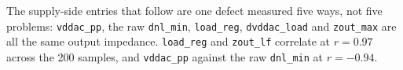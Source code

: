 The supply-side entries that follow are one defect measured five ways, not five problems:
\texttt{vddac\_pp}, the raw \texttt{dnl\_min}, \texttt{load\_reg}, \texttt{dvddac\_load}
and \texttt{zout\_max} are all the same output impedance. \texttt{load\_reg} and
\texttt{zout\_lf} correlate at \(r = \num{0.97}\) across the 200 samples, and
\texttt{vddac\_pp} against the raw \texttt{dnl\_min} at \(r = \num{-0.94}\).
